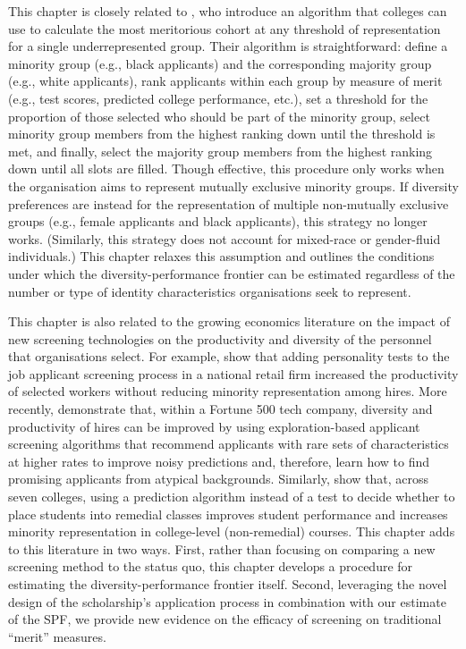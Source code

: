 This chapter is closely related to \textcite{kleinberg2018algorithmic}, who introduce an algorithm that colleges can use to calculate the most meritorious cohort at any threshold of representation for a single underrepresented group. Their algorithm is straightforward: define a minority group (e.g., black applicants) and the corresponding majority group (e.g., white applicants), rank applicants within each group by measure of merit (e.g., test scores, predicted college performance, etc.), set a threshold for the proportion of those selected who should be part of the minority group, select minority group members from the highest ranking down until the threshold is met, and finally, select the majority group members from the highest ranking down until all slots are filled. Though effective, this procedure only works when the organisation aims to represent mutually exclusive minority groups. If diversity preferences are instead for the representation of multiple non-mutually exclusive groups (e.g., female applicants and black applicants), this strategy no longer works. (Similarly, this strategy does not account for mixed-race or gender-fluid individuals.) This chapter relaxes this assumption and outlines the conditions under which the diversity-performance frontier can be estimated regardless of the number or type of identity characteristics organisations seek to represent.

This chapter is also related to the growing economics literature on the impact of new screening technologies on the productivity and diversity of the personnel that organisations select. For example, \textcite{autor2008does} show that adding personality tests to the job applicant screening process in a national retail firm increased the productivity of selected workers without reducing minority representation among hires. More recently, \textcite{li2020hiring} demonstrate that, within a Fortune 500 tech company, diversity and productivity of hires can be improved by using exploration-based applicant screening algorithms that recommend applicants with rare sets of characteristics at higher rates to improve noisy predictions and, therefore, learn how to find promising applicants from atypical backgrounds. Similarly, \textcite{bergman2021seven} show that, across seven colleges, using a prediction algorithm instead of a test to decide whether to place students into remedial classes improves student performance and increases minority representation in college-level (non-remedial) courses. This chapter adds to this literature in two ways. First, rather than focusing on comparing a new screening method to the status quo, this chapter develops a procedure for estimating the diversity-performance frontier itself. Second, leveraging the novel design of the scholarship's application process in combination with our estimate of the SPF, we provide new evidence on the efficacy of screening on traditional ``merit'' measures. 

